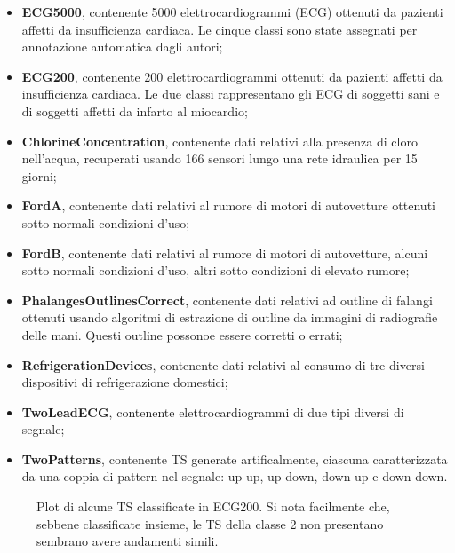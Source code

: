 \begin{itemize}
	\item \textbf{ECG5000}, contenente 5000 elettrocardiogrammi (ECG) ottenuti da pazienti affetti da insufficienza cardiaca. Le cinque classi sono state assegnati per annotazione automatica dagli autori;
	\item \textbf{ECG200}, contenente 200 elettrocardiogrammi ottenuti da pazienti affetti da insufficienza cardiaca. Le due classi rappresentano gli ECG di soggetti sani e di soggetti affetti da infarto al miocardio;
	\item \textbf{ChlorineConcentration}, contenente dati relativi alla presenza di cloro nell'acqua, recuperati usando 166 sensori lungo una rete idraulica per 15 giorni;
	\item \textbf{FordA}, contenente dati relativi al rumore di motori di autovetture ottenuti sotto normali condizioni d'uso;
	\item \textbf{FordB}, contenente dati relativi al rumore di motori di autovetture, alcuni sotto normali condizioni d'uso, altri sotto condizioni di elevato rumore;
	\item \textbf{PhalangesOutlinesCorrect}, contenente dati relativi ad outline di falangi ottenuti usando algoritmi di estrazione di outline da immagini di radiografie delle mani. Questi outline possonoe essere corretti o errati;
	\item \textbf{RefrigerationDevices}, contenente dati relativi al consumo di tre diversi dispositivi di refrigerazione domestici;
	\item \textbf{TwoLeadECG}, contenente elettrocardiogrammi di due tipi diversi di segnale;
	\item \textbf{TwoPatterns}, contenente TS generate artificalmente, ciascuna caratterizzata da una coppia di pattern nel segnale: up-up, up-down, down-up e down-down.
\end{itemize}

\begin{figure}[H]
	\centering
	\caption{Plot di alcune TS classificate in ECG200. Si nota facilmente che, sebbene classificate insieme, le TS della classe 2 non presentano sembrano avere andamenti simili.}
	\label{fig:ecg200}
\end{figure}

